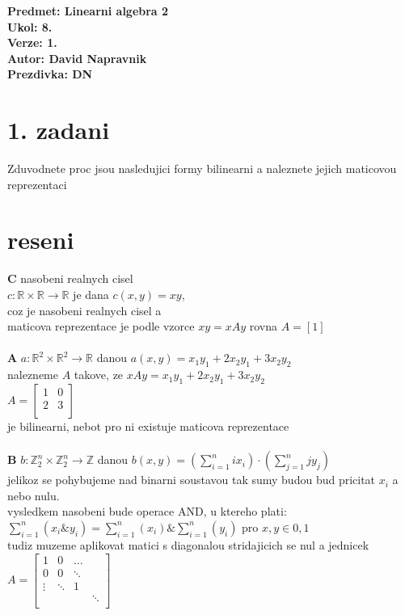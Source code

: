 \documentclass[a4paper]{article}
\def\doubleunderline#1{\underline{\underline{#1}}}
\begin{document}
\noindent
\textbf{Predmet: Linearni algebra 2}\\
\textbf{Ukol: 8.}\\
\textbf{Verze: 1.}\\
\textbf{Autor: David Napravnik}\\
\textbf{Prezdivka: DN}


\section*{1. zadani}
Zduvodnete proc jsou nasledujici formy bilinearni a naleznete
jejich maticovou reprezentaci

\section*{reseni}
\textbf{C} nasobeni realnych cisel\\
$c:\mathbb{R}\times\mathbb{R}\rightarrow\mathbb{R}$ je dana $c(x,y) = xy$,\\
coz je nasobeni realnych cisel a\\
maticova reprezentace je podle vzorce $xy = xAy$ rovna \doubleunderline{$A=[1]$}
\\\\
\textbf{A} $a:\mathbb{R}^2\times\mathbb{R}^2\rightarrow\mathbb{R}$ danou
$a(x,y) = x_1y_1+2x_2y_1+3x_2y_2$\\
nalezneme $A$ takove, ze $xAy = x_1y_1+2x_2y_1+3x_2y_2$\\
\doubleunderline{$A = 
\begin{bmatrix}
	1 & 0 \\
	2 & 3 \\
\end{bmatrix}
$}\\
je bilinearni, nebot pro ni existuje maticova reprezentace
\\\\
\textbf{B} $b:\mathbb{Z}^n_2\times\mathbb{Z}^n_2\rightarrow\mathbb{Z}$ danou
$b(x,y) = \left(\sum^n_{i=1}ix_i \right) \cdot
\left(\sum^n_{j=1}jy_j \right)$\\
jelikoz se pohybujeme nad binarni soustavou tak sumy budou bud pricitat $x_i$ a nebo nulu.\\
vysledkem nasobeni bude operace AND, u ktereho plati:
$\sum^n_{i=1}(x_i \& y_i) = \sum^n_{i=1}(x_i) \& \sum^n_{i=1}(y_i)$ pro $x,y \in {0,1}$\\
tudiz muzeme aplikovat matici s diagonalou stridajicich se nul a jednicek\\
\doubleunderline{$A =
\begin{bmatrix}
	1 & 0 & \dots \\
	0 & 0 & \ddots \\
	\vdots & \ddots& 1 \\
	 & & & \ddots\\
\end{bmatrix}
$}
\end{document}
